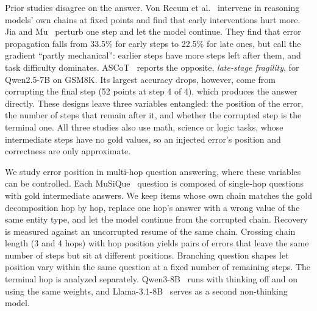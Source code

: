 \documentclass[conference]{IEEEtran}
\begin{document}
Prior studies disagree on the answer. Von Recum et al.~\cite{vonrecum} intervene in reasoning models' own chains at fixed points and find that early interventions hurt more. Jia and Mu~\cite{jiamu} perturb one step and let the model continue. They find that error propagation falls from 33.5\% for early steps to 22.5\% for late ones, but call the gradient ``partly mechanical'': earlier steps have more steps left after them, and task difficulty dominates. ASCoT~\cite{ascot} reports the opposite, \emph{late-stage fragility}, for Qwen2.5-7B on GSM8K. Its largest accuracy drops, however, come from corrupting the final step (52 points at step 4 of 4), which produces the answer directly. These designs leave three variables entangled: the position of the error, the number of steps that remain after it, and whether the corrupted step is the terminal one. All three studies also use math, science or logic tasks, whose intermediate steps have no gold values, so an injected error's position and correctness are only approximate.

We study error position in multi-hop question answering, where these variables can be controlled. Each MuSiQue~\cite{musique} question is composed of single-hop questions with gold intermediate answers. We keep items whose own chain matches the gold decomposition hop by hop, replace one hop's answer with a wrong value of the same entity type, and let the model continue from the corrupted chain. Recovery is measured against an uncorrupted resume of the same chain. Crossing chain length (3 and 4 hops) with hop position yields pairs of errors that leave the same number of steps but sit at different positions. Branching question shapes let position vary within the same question at a fixed number of remaining steps. The terminal hop is analyzed separately. Qwen3-8B~\cite{qwen3} runs with thinking off and on using the same weights, and Llama-3.1-8B~\cite{llama3} serves as a second non-thinking model.
\end{document}
